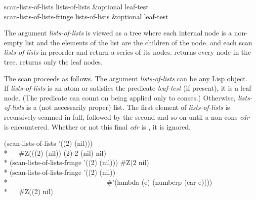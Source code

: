 \begin{defun}[Function]
scan-lists-of-lists lists-of-lists &optional leaf-test \\
scan-lists-of-lists-fringe lists-of-lists &optional leaf-test

The argument \emph{lists-of-lists} is viewed as a tree where each
internal node is a non-empty list and the elements of the list are the
children of the node.   and
 each scan \emph{lists-of-lists} in preorder
and return a series of its nodes.   returns every
node in the tree.   returns only the leaf
nodes.  

The scan proceeds as follows.  The argument \emph{lists-of-lists} can be any
Lisp object.  If \emph{lists-of-lists} is an atom or satisfies the predicate
\emph{leaf-test} (if present), it is a leaf node.  (The predicate can count
on being applied only to conses.) Otherwise, \emph{lists-of-lists} is a (not
necessarily proper) list.  The first element of \emph{lists-of-lists} is
recursively scanned in full, followed by the second and so on until a
non-cons \emph{cdr} is encountered.  Whether or not this final \emph{cdr} is
, it is ignored.
\begin{lisp}
(scan-lists-of-lists '((2) (nil))) \\*
~~{\EV} \#Z(((2) (nil)) (2) 2 (nil) nil) \\*
(scan-lists-of-lists-fringe '((2) (nil))) {\EV} \#Z(2 nil) \\*
(scan-lists-of-lists-fringe '((2) (nil)) \\*
~~~~~~~~~~~~~~~~~~~~~~~~~~~~\#'(lambda (e) (numberp (car e)))) \\*
~~{\EV} \#Z((2) nil)
\end{lisp}
\end{defun}

